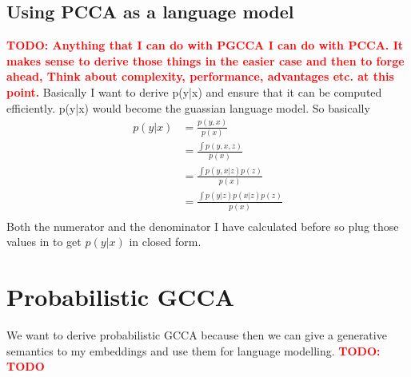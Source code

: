 \documentclass[11pt]{article}
\newcommand{\todo}[1]{\textbf{\textcolor{red}{TODO: #1}}}
\begin{document}
\subsection{Using PCCA as a language model}
\todo{Anything that I can do with PGCCA I can do with PCCA. It makes sense to derive those things in the easier case and then to forge ahead, Think about complexity, performance, advantages etc. at this point.}
Basically I want to derive p(y|x) and ensure that it can be computed efficiently. p(y|x) would become the guassian language model.
So basically
\begin{align}
  p(y|x) &= \frac{p(y,x)}{p(x)} \\
  &= \frac{\int p(y,x,z)}{p(x)}\\
  &= \frac{\int p(y,x|z)p(z)}{p(x)}\\
  &= \frac{\int p(y|z)p(x|z)p(z)}{p(x)}\\
\end{align}
Both the numerator and the denominator I have calculated before so plug those values in to get $p(y|x)$ in closed form.
\section{Probabilistic GCCA}
We want to derive probabilistic GCCA because then we can give a generative semantics to my embeddings and use them for language modelling.
\todo{TODO}
\end{document}
